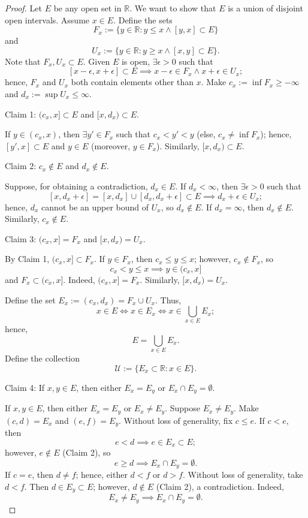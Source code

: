 \documentclass{amsart}
\theoremstyle{definition}
\begin{document}
\begin{proof}
    Let $E$ be any open set in $\mathbb{R}$. We want to show that $E$ is a union of disjoint open intervals. Assume $x \in E$. Define the sets
    \[
    F_x := \{y \in \mathbb{R} : y \leq x \land [y,x] \subset E\}  
    \]
    and 
    \[
    U_x := \{y \in \mathbb{R} : y \geq x \land [x,y] \subset E\}. \]
    Note that $F_x,U_x \subset E$. Given $E$ is open, $\exists \epsilon > 0$ such that 
    \[
    [x - \epsilon,x + \epsilon] \subset E \implies x - \epsilon \in F_x \land x + \epsilon \in U_x;
    \]
    hence, $F_x$ and $U_x$ both contain elements other than $x$. Make $c_x := \inf F_x \geq -\infty$ and $d_x := \sup U_x \leq \infty$.

    Claim 1: $(c_x,x] \subset E$ and $[x,d_x) \subset E$.

    If $y \in (c_x,x)$, then $\exists y' \in F_x$ such that $c_x < y' < y$ (else, $c_x \neq \inf F_x$); hence, $[y',x] \subset E$ and $y \in E$ (moreover, $y \in F_x$). Similarly, $[x,d_x) \subset E$.

    Claim 2: $c_x \notin E$ and $d_x \notin E$. 

    Suppose, for obtaining a contradiction, $d_x \in E$. If $d_x < \infty$, then $\exists \epsilon > 0$ such that
    \[
    [x,d_x+\epsilon] = [x,d_x] \cup [d_x,d_x+\epsilon] \subset E \implies d_x+\epsilon \in U_x;
    \]
    hence, $d_x$ cannot be an upper bound of $U_x$, so $d_x \notin E$. If $d_x = \infty$, then $d_x \notin E$. Similarly, $c_x \notin E$.

    Claim 3: $(c_x,x] = F_x$ and $[x,d_x) = U_x$.

    By Claim 1, $(c_x,x] \subset F_x$. If $y \in F_x$, then $c_x \leq y \leq x$; however, $c_x \notin F_x$, so 
    \[
    c_x < y \leq x \implies y \in (c_x,x]
    \]
    and $F_x \subset (c_x,x]$. Indeed, $(c_x,x] = F_x$. Similarly, $[x,d_x) = U_x$. 
    
    Define the set $E_x := (c_x,d_x) = F_x \cup U_x$. Thus,
    \[
    x \in E \iff x \in E_x \iff x \in \bigcup_{x \in E}E_x; 
    \]
    hence,
    \[
    E = \bigcup_{x \in E}E_x.
    \]
    Define the collection
    \[
    \mathcal{U} := \{E_x \subset \mathbb{R} : x \in E\}.
    \]
    
    Claim 4: If $x,y \in E$, then either $E_x = E_y$ or $E_x \cap E_y = \emptyset$.

    If $x,y \in E$, then either $E_x = E_y$ or $E_x \neq E_y$. Suppose $E_x \neq E_y$. Make $(c,d) = E_x$ and $(e,f) = E_y$. Without loss of generality, fix $c \leq e$. If $c < e$, then 
    \[
    e < d \implies e \in E_x \subset E;
    \]
    however, $e \notin E$ (Claim 2), so 
    \[
    e \geq d \implies E_x \cap E_y = \emptyset.
    \]
    If $c = e$, then $d \neq f$; hence, either $d < f$ or $d > f$. Without loss of generality, take $d < f$. Then $d \in E_y \subset E$; however, $d \notin E$ (Claim 2), a contradiction. Indeed, 
    \[
    E_x \neq E_y \implies E_x \cap E_y = \emptyset.
    \]


\end{proof}
\end{document}
